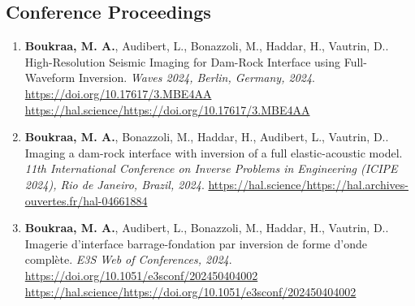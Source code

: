 \documentclass[10pt]{article}
\begin{document}
\subsection{Conference Proceedings}
\begin{enumerate}
\item \textbf{Boukraa, M. A.}, Audibert, L., Bonazzoli, M., Haddar, H., Vautrin, D.. High-Resolution Seismic Imaging for Dam-Rock Interface using Full-Waveform Inversion. \textit{Waves 2024, Berlin, Germany, 2024}. \url{https://doi.org/10.17617/3.MBE4AA} \url{https://hal.science/https://doi.org/10.17617/3.MBE4AA}
\item \textbf{Boukraa, M. A.}, Bonazzoli, M., Haddar, H., Audibert, L., Vautrin, D.. Imaging a dam-rock interface with inversion of a full elastic-acoustic model. \textit{11th International Conference on Inverse Problems in Engineering (ICIPE 2024), Rio de Janeiro, Brazil, 2024}. \url{https://hal.science/https://hal.archives-ouvertes.fr/hal-04661884}
\item \textbf{Boukraa, M. A.}, Audibert, L., Bonazzoli, M., Haddar, H., Vautrin, D.. Imagerie d’interface barrage-fondation par inversion de forme d’onde complète. \textit{E3S Web of Conferences, 2024}. \url{https://doi.org/10.1051/e3sconf/202450404002} \url{https://hal.science/https://doi.org/10.1051/e3sconf/202450404002}
\end{enumerate}
\end{document}

